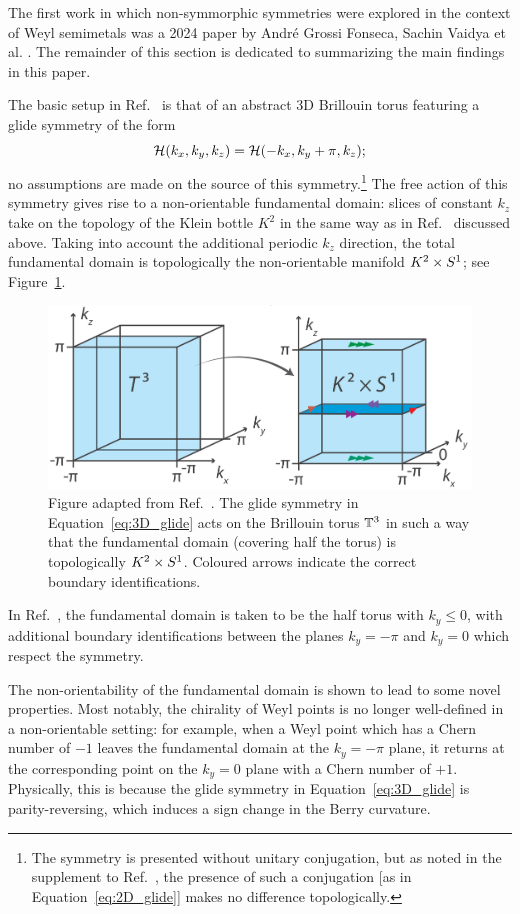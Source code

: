 The first work in which non-symmorphic symmetries were explored in the context of Weyl semimetals was a 2024 paper by André Grossi Fonseca, Sachin Vaidya et al. \cite{Fonseca-Vaidya_nonorientable}. The remainder of this section is dedicated to summarizing the main findings in this paper.

The basic setup in Ref.~\cite{Fonseca-Vaidya_nonorientable} is that of an abstract 3D Brillouin torus featuring a glide symmetry of the form
\begin{equation}\label{eq:3D_glide}
	\mathcal{H}(k_x, k_y, k_z) = \mathcal{H}(-k_x, k_y + \pi, k_z);
\end{equation}
no assumptions are made on the source of this symmetry.\footnote{
	The symmetry is presented without unitary conjugation, but as noted in the supplement to Ref.~\cite{Fonseca-Vaidya_nonorientable}, the presence of such a conjugation [as in Equation~\eqref{eq:2D_glide}] makes no difference topologically.}
The free action of this symmetry gives rise to a non-orientable fundamental domain: slices of constant $k_z$ take on the topology of the Klein bottle $K^2$ in the same way as in Ref.~\cite{CYZ_Klein-gauge} discussed above. Taking into account the additional periodic $k_z$ direction, the total fundamental domain is topologically the non-orientable manifold $K^2\times S^1$; see Figure~\ref{fig:K2S1}.
\begin{figure}[htb!]
	\centering
	\includegraphics[width=.7\linewidth]{Images/K2S1}
	\caption{Figure adapted from Ref.~\cite{Fonseca-Vaidya_nonorientable}. The glide symmetry in Equation~\eqref{eq:3D_glide} acts on the Brillouin torus $\mathbb{T}^3$ in such a way that the fundamental domain (covering half the torus) is topologically $K^2\times S^1$. Coloured arrows indicate the correct boundary identifications.} %
	\label{fig:K2S1}
\end{figure}
In Ref.~\cite{Fonseca-Vaidya_nonorientable}, the fundamental domain is taken to be the half torus with $k_y\leq 0$, with additional boundary identifications between the planes $k_y=-\pi$ and $k_y=0$ which respect the symmetry.

The non-orientability of the fundamental domain is shown to lead to some novel properties. Most notably, the chirality of Weyl points is no longer well-defined in a non-orientable setting: for example, when a Weyl point which has a Chern number of $-1$ leaves the fundamental domain at the $k_y=-\pi$ plane, it returns at the corresponding point on the $k_y=0$ plane with a Chern number of $+1$. Physically, this is because the glide symmetry in Equation~\eqref{eq:3D_glide} is parity-reversing, which induces a sign change in the Berry curvature.


